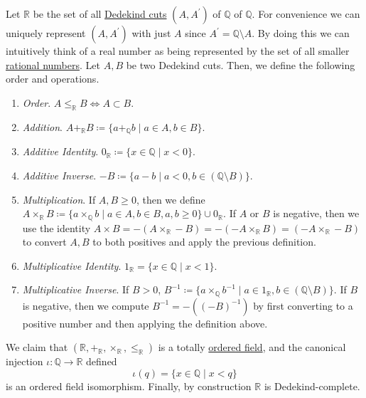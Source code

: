   \begin{theorem}
    \label{thm:reals-as-the-dedekind-completion-of-rationals}
    Let $\mathbb{R}$ be the set of all \hyperref[def:dedekind-cut]{Dedekind cuts} $(A, A^\prime)$ of $\mathbb{Q}$ of $\mathbb{Q}$. For convenience we can uniquely represent $(A, A^\prime)$ with just $A$ since $A^\prime = \mathbb{Q} \setminus A$. By doing this we can intuitively think of a real number as being represented by the set of all smaller \hyperref[def:rational-numbers]{rational numbers}. Let $A, B$ be two Dedekind cuts. Then, we define the following order and operations. 
    \begin{enumerate}
      \item \textit{Order}. $A \leq_{\mathbb{R}} B \iff A \subset B$. 
      \item \textit{Addition}. $A +_{\mathbb{R}} B \coloneqq \{ a +_{\mathbb{Q}} b \mid a \in A, b \in B \}$. 
      \item \textit{Additive Identity}. $0_{\mathbb{R}} \coloneqq \{x \in \mathbb{Q} \mid x < 0 \}$. 
      \item \textit{Additive Inverse}. $-B \coloneqq \{ a - b \mid a < 0 , b \in (\mathbb{Q} \setminus B) \}$.
      \item \textit{Multiplication}. If $A, B \geq 0$, then we define $A \times_{\mathbb{R}} B \coloneqq \{ a \times_{\mathbb{Q}} b \mid a \in A, b \in B, a, b \geq 0\} \cup 0_{\mathbb{R}}$. If $A$ or $B$ is negative, then we use the identity $A \times B = -(A \times_{\mathbb{R}} -B) = -(-A \times_{\mathbb{R}} B) = (-A \times_{\mathbb{R}} -B)$ to convert $A, B$ to both positives and apply the previous definition. 
      \item \textit{Multiplicative Identity}. $1_{\mathbb{R}} = \{x \in \mathbb{Q} \mid x < 1 \}$. 
      \item \textit{Multiplicative Inverse}. If $B > 0$, $B^{-1} \coloneqq \{ a \times_{\mathbb{Q}} b^{-1} \mid a \in 1_{\mathbb{R}}, b \in (\mathbb{Q} \setminus B) \}$. If $B$ is negative, then we compute $B^{-1} = -((-B)^{-1})$ by first converting to a positive number and then applying the definition above. 
    \end{enumerate}
    We claim that $(\mathbb{R}, +_{\mathbb{R}}, \times_{\mathbb{R}}, \leq_{\mathbb{R}})$ is a totally \hyperref[def:ordered-field]{ordered field}, and the canonical injection $\iota: \mathbb{Q} \rightarrow \mathbb{R}$ defined 
    \begin{equation}
      \iota(q) = \{x \in \mathbb{Q} \mid x < q \}
    \end{equation}
    is an ordered field isomorphism. Finally, by construction $\mathbb{R}$ is Dedekind-complete. 
  \end{theorem} 

